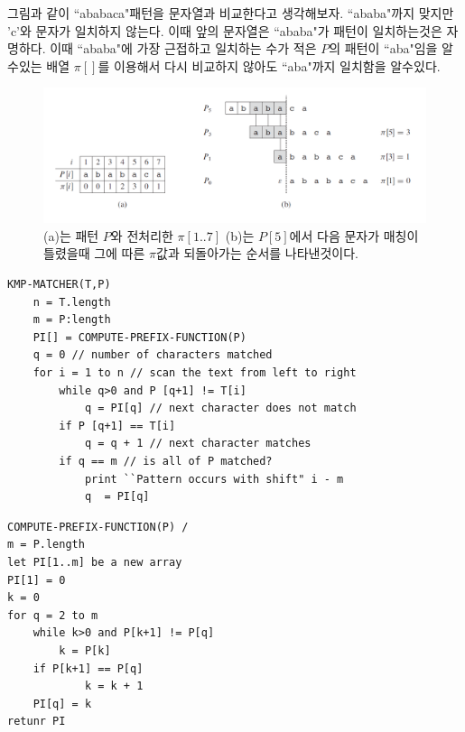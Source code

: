 그림과 같이 ``ababaca"패턴을 문자열과 비교한다고 생각해보자.
``ababa"까지 맞지만 'c'와 문자가 일치하지 않는다. 이때 앞의 문자열은 ``ababa"가 패턴이 일치하는것은 자명하다. 이때 ``ababa"에 가장 근접하고 일치하는 수가 적은 $P$의 패턴이 ``aba"임을 알수있는 배열 $\pi[]$를 이용해서 다시 비교하지 않아도 ``aba"까지 일치함을 알수있다. 


\begin{figure}[h!]
    \centering
    \includegraphics[scale=0.4]{pic4.PNG}
    \caption{(a)는 패턴 $P$와 전처리한 $\pi[1..7]$ (b)는 $P[5]$에서 다음 문자가 매칭이 틀렸을때 그에 따른 $\pi$값과 되돌아가는 순서를 나타낸것이다.}
\end{figure}


\begin{lstlisting}[style = CStyle]
KMP-MATCHER(T,P)
    n = T.length
    m = P:length
    PI[] = COMPUTE-PREFIX-FUNCTION(P)
    q = 0 // number of characters matched
    for i = 1 to n // scan the text from left to right
        while q>0 and P [q+1] != T[i]
            q = PI[q] // next character does not match  
        if P [q+1] == T[i]
            q = q + 1 // next character matches
        if q == m // is all of P matched?
            print ``Pattern occurs with shift" i - m
            q  = PI[q]
\end{lstlisting}



\begin{lstlisting}[style = CStyle]
COMPUTE-PREFIX-FUNCTION(P) /
m = P.length
let PI[1..m] be a new array
PI[1] = 0
k = 0
for q = 2 to m
    while k>0 and P[k+1] != P[q]
        k = P[k]
    if P[k+1] == P[q]
            k = k + 1
    PI[q] = k 
retunr PI
\end{lstlisting}
